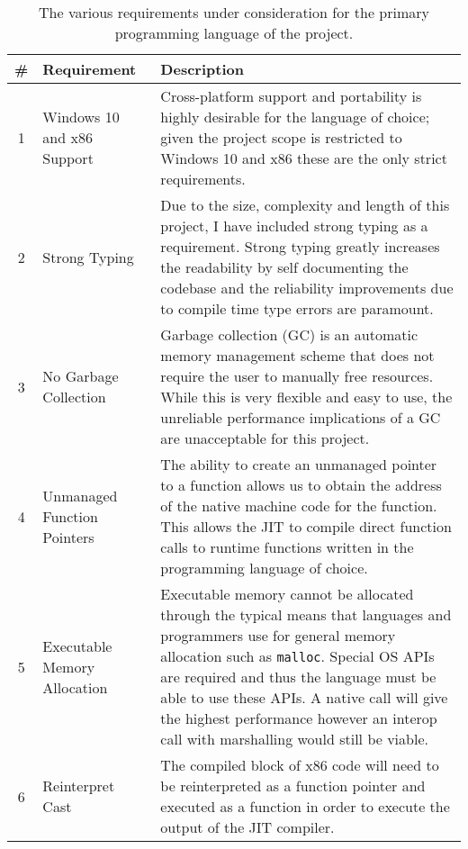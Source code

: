 \begin{table}[h]
    \centering
    \begin{tabularx}{\linewidth}{c|l|X}
        \toprule
        \textbf{\#} & \textbf{Requirement} & \textbf{Description} \\
        \midrule
        1 & Windows 10 and x86 Support & Cross-platform support and portability is highly desirable for the language of choice; given the project scope is restricted to Windows 10 and x86 these are the only strict requirements. \\
        \midrule
        2 & Strong Typing & Due to the size, complexity and length of this project, I have included strong typing as a requirement. Strong typing greatly increases the readability by self documenting the codebase and the reliability improvements due to compile time type errors are paramount. \\
        \midrule
        3 & No Garbage Collection & Garbage collection (GC) is an automatic memory management scheme that does not require the user to manually free resources. While this is very flexible and easy to use, the unreliable performance implications of a GC are unacceptable for this project. \\
        \midrule
        4 & Unmanaged Function Pointers & The ability to create an unmanaged pointer to a function allows us to obtain the address of the native machine code for the function. This allows the JIT to compile direct function calls to runtime functions written in the programming language of choice. \\
        \midrule
        5 & Executable Memory Allocation & Executable memory cannot be allocated through the typical means that languages and programmers use for general memory allocation such as \texttt{malloc}. Special OS APIs are required and thus the language must be able to use these APIs. A native call will give the highest performance however an interop call with marshalling would still be viable. \\
        \midrule
        6 & Reinterpret Cast & The compiled block of x86 code will need to be reinterpreted as a function pointer and executed as a function in order to execute the output of the JIT compiler. \\
        \bottomrule
    \end{tabularx}
    \caption{The various requirements under consideration for the primary programming language of the project. }
    \label{list:req-features}
\end{table}

